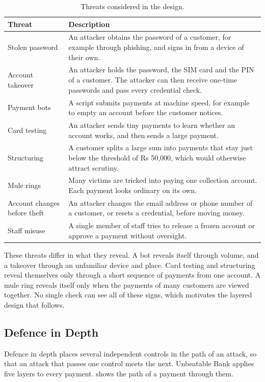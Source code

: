 \documentclass[11pt,a4paper]{article}
\newcommand{\project}{Unbeatable Bank}
\begin{document}
\begin{table}[htbp]\centering\small
\caption{Threats considered in the design.}\label{tab:threats}
\begin{tabularx}{\linewidth}{@{}L{3.4cm}Y@{}}
\toprule
Threat & Description \\
\midrule
Stolen password & An attacker obtains the password of a customer, for example through phishing, and signs in from a device of their own. \\
Account takeover & An attacker holds the password, the SIM card and the PIN of a customer. The attacker can then receive one-time passwords and pass every credential check. \\
Payment bots & A script submits payments at machine speed, for example to empty an account before the customer notices. \\
Card testing & An attacker sends tiny payments to learn whether an account works, and then sends a large payment. \\
Structuring & A customer splits a large sum into payments that stay just below the threshold of Rs 50,000, which would otherwise attract scrutiny. \\
Mule rings & Many victims are tricked into paying one collection account. Each payment looks ordinary on its own. \\
Account changes before theft & An attacker changes the email address or phone number of a customer, or resets a credential, before moving money. \\
Staff misuse & A single member of staff tries to release a frozen account or approve a payment without oversight. \\
\bottomrule
\end{tabularx}
\end{table}

These threats differ in what they reveal. A bot reveals itself through volume, and a takeover through an unfamiliar device and place. Card testing and structuring reveal themselves only through a short sequence of payments from one account. A mule ring reveals itself only when the payments of many customers are viewed together. No single check can see all of these signs, which motivates the layered design that follows.

\subsection{Defence in Depth}
\label{sec:depth}

Defence in depth places several independent controls in the path of an attack, so that an attack that passes one control meets the next. \project{} applies five layers to every payment.  shows the path of a payment through them.
\end{document}
